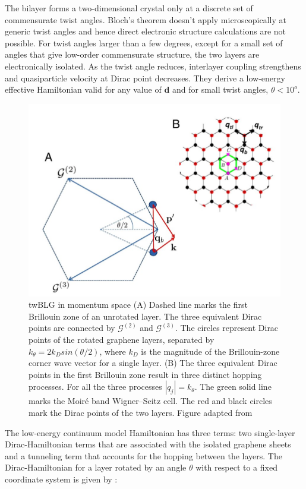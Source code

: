 The bilayer forms a two-dimensional crystal only at a discrete set of commensurate twist angles. Bloch's theorem doesn't apply microscopically at generic twist angles and hence direct electronic structure calculations are not possible. For twist angles larger than a few degrees, except for a small set of angles that give low-order commensurate structure, the two layers are electronically isolated. As the twist angle reduces, interlayer coupling strengthens and quasiparticle velocity at Dirac point decreases. They derive a low-energy effective Hamiltonian valid for any value of $\mathbf{d}$ and for small twist angles, $\theta<10^o$. \cite{Bistritzer12233}
\begin{figure}[H]
	\centering
	\includegraphics[width=\textwidth]{figures/contmodel.jpg}
	\caption{twBLG in momentum space (A) Dashed line marks the first Brillouin zone of an unrotated layer. The three equivalent Dirac points are connected by  $\mathcal{G}^{(2)}$ and $\mathcal{G}^{(3)}$. The circles represent Dirac points of the rotated graphene layers, separated by $k_\theta = 2k_D sin(\theta/2)$, where $k_D$ is the magnitude of the Brillouin-zone corner wave vector for a single layer. (B) The three equivalent Dirac points in the first Brillouin zone result in three distinct hopping processes. For all the three processes $|q_j| = k_\theta$. The green solid line marks the Moiré band Wigner–Seitz cell. The red and black circles mark the Dirac points of the two layers. Figure adapted from \cite{Bistritzer12233}}
	\label{fig:contmodel}
\end{figure}
The low-energy continuum model Hamiltonian has three terms: two single-layer Dirac-Hamiltonian terms that are associated with the isolated graphene sheets and a tunneling term that accounts for the hopping between the layers. The Dirac-Hamiltonian for a layer rotated by an angle $\theta$ with respect to a fixed coordinate system is given by \cite{Geim}:
